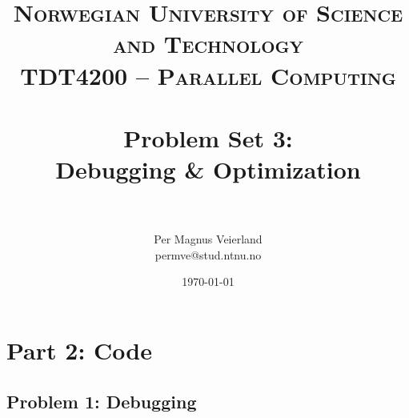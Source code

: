 

\title{	
\normalfont \normalsize 
\textsc{Norwegian University of Science and Technology\\TDT4200 -- Parallel Computing} \\ [25pt]
\horrule{0.5pt} \\[0.4cm]
\huge Problem Set 3:\\ Debugging \& Optimization\\
\horrule{2pt} \\[0.5cm]
}

\author{Per Magnus Veierland\\permve@stud.ntnu.no}


\date{\normalsize\today}


\maketitle

\section*{Part 2: Code}

\subsection*{Problem 1: Debugging}

